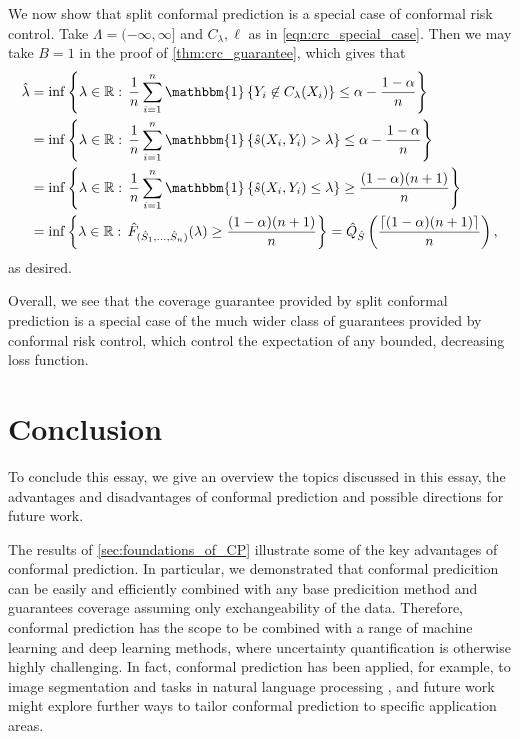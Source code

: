 \documentclass[11pt, titlepage]{article} %
\newcommand{\Ind}[1]{\mathbbm{1}\left\{ #1 \right\}}
\numberwithin{equation}{section}
\theoremstyle{definition}
\numberwithin{theorem}{section}
\numberwithin{lemma}{section}
\numberwithin{corollary}{section}
\numberwithin{proposition}{section}
\numberwithin{definition}{section}
\numberwithin{remark}{section}
\begin{document}
\noindent
We now show that split conformal prediction is a special case of conformal risk control. Take \(\Lambda = (-\infty, \infty]\) and \(C_\lambda, \ell\) as in \eqref{eqn:crc_special_case}. Then we may take \(B = 1\) in the proof of \cref{thm:crc_guarantee}, which gives that \begin{align*}
    \hat{\lambda} &= \inf \left\{ \lambda \in \mathbb{R}: \, \frac{1}{n} \sum_{i=1}^{n} \Ind{Y_i \not \in C_\lambda (X_i)} \leq \alpha - \frac{1-\alpha}{n} \right\} \\
    &= \inf \left\{ \lambda \in \mathbb{R}: \, \frac{1}{n} \sum_{i=1}^{n} \Ind{\hat{s}(X_i, Y_i) > \lambda} \leq \alpha - \frac{1-\alpha}{n} \right\} \\
    &= \inf \left\{ \lambda \in \mathbb{R}: \, \frac{1}{n} \sum_{i=1}^{n} \Ind{\hat{s}(X_i, Y_i) \leq \lambda} \geq \frac{(1-\alpha)(n+1)}{n} \right\} \\
    &= \inf \left\{ \lambda \in \mathbb{R}: \, \hat{F}_{(\hat{S}_1, \ldots, \hat{S}_n)}(\lambda) \geq \frac{(1-\alpha)(n+1)}{n} \right\} = \hat{Q}_{\hat{S}}\left( \frac{\lceil (1-\alpha)(n+1) \rceil}{n} \right),
\end{align*} as desired. \vskip5pt

\noindent
Overall, we see that the coverage guarantee provided by split conformal prediction is a special case of the much wider class of guarantees provided by conformal risk control, which control the expectation of any bounded, decreasing loss function.

\vfill \eject

\section{Conclusion}

To conclude this essay, we give an overview the topics discussed in this essay, the advantages and disadvantages of conformal prediction and possible directions for future work. \vskip5pt

\noindent
The results of \cref{sec:foundations_of_CP} illustrate some of the key advantages of conformal prediction. In particular, we demonstrated that conformal predicition can be easily and efficiently combined with any base predicition method and guarantees coverage assuming only exchangeability of the data. Therefore, conformal prediction has the scope to be combined with a range of machine learning and deep learning methods, where uncertainty quantification is otherwise highly challenging. In fact, conformal prediction has been applied, for example, to image segmentation \cite{angelopoulos2024riskcontrol, mossina2024conformal} and tasks in natural language processing \cite{campos2024conformalpredictionnaturallanguage, cherian2024large}, and future work might explore further ways to tailor conformal prediction to specific application areas. \vskip5pt
\end{document}
